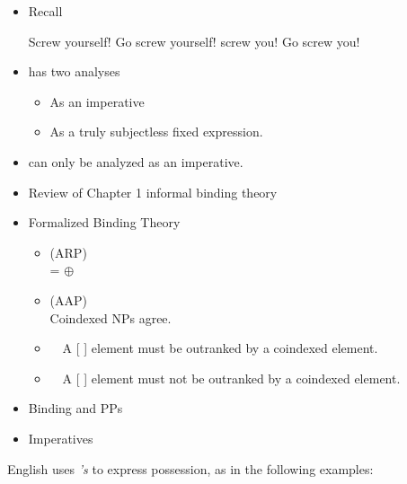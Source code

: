 \documentclass[a4paper,landscape,headrule,footrule]{foils}
\begin{document}
\begin{itemize}
\item Recall
  \begin{exe}
    \ix Screw yourself!
    \ix Go screw yourself!
    \ix screw you!
    \ix *Go screw you!
  \end{exe}
\item {} has two analyses
  \begin{itemize}
  \item As an imperative
  \item As a truly subjectless fixed expression.
  \end{itemize}
\item {} can only be analyzed as an imperative.
\end{itemize}


\begin{itemize}\addtolength{\itemsep}{-2ex}
\item Review of Chapter 1 informal binding
theory
\item Formalized Binding Theory
  \begin{itemize}
  \item {} (ARP)
    \\   =   $\oplus$ 
  \item {} (AAP)
   \\ Coindexed NPs agree.
 \item {}\ \  A [ ] element must be
outranked by a coindexed element.
\item {}\ \  A [ ] element must not
be outranked by a coindexed element.
  \end{itemize}
\item Binding and PPs
\item Imperatives
\end{itemize}



English uses {\it 's} to express possession, as in the following examples:
\end{document}
